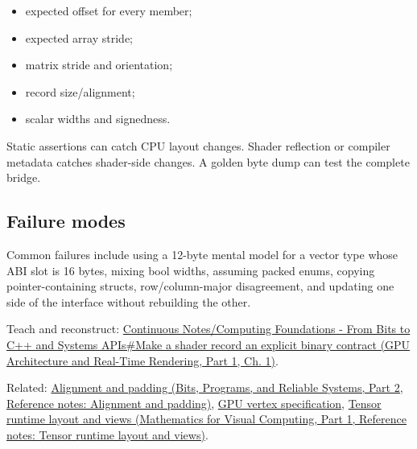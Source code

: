 \begin{itemize}
\tightlist
\item
  expected offset for every member;
\item
  expected array stride;
\item
  matrix stride and orientation;
\item
  record size/alignment;
\item
  scalar widths and signedness.
\end{itemize}

Static assertions can catch CPU layout changes. Shader reflection or compiler metadata catches shader-side changes. A golden byte dump can test the complete bridge.

\subsection{Failure modes}\label{appendix-749048795dbb-failure-modes}

\hypertarget{appendix-749048795dbb-failure-modes}{}

Common failures include using a 12-byte mental model for a vector type whose ABI slot is 16 bytes, mixing bool widths, assuming packed enums, copying pointer-containing structs, row/column-major disagreement, and updating one side of the interface without rebuilding the other.

Teach and reconstruct: \href{../06-GPU-Architecture-and-Real-Time-Rendering-P01/main.pdf\#01-foundations-i-ch008-make-a-shader-record-an-explicit-binary-contract}{Continuous Notes/Computing Foundations - From Bits to C++ and Systems APIs\#Make a shader record an explicit binary contract (GPU Architecture and Real-Time Rendering, Part 1, Ch. 1)}.

Related: \href{../01-Bits-Programs-and-Reliable-Systems-P02/main.pdf\#appendix-a1f7c53b4742}{Alignment and padding (Bits, Programs, and Reliable Systems, Part 2, Reference notes: Alignment and padding)}, \hyperref[appendix-749ba51a6c25]{GPU vertex specification}, \href{../02-Mathematics-for-Visual-Computing-P01/main.pdf\#appendix-cebadf3106d1}{Tensor runtime layout and views (Mathematics for Visual Computing, Part 1, Reference notes: Tensor runtime layout and views)}.
